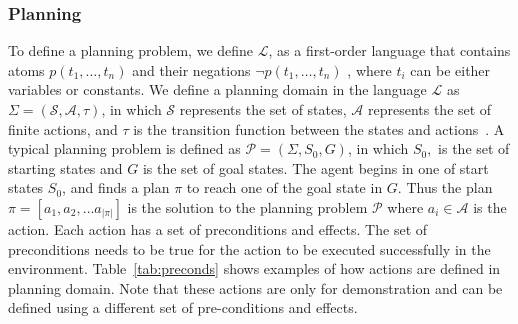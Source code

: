 \documentclass[sigconf]{aamas}
\begin{document}
\subsubsection{Planning}
To define a planning problem, we define $\mathcal{L}$, as a first-order language that contains atoms $p\left(t_{1}, \ldots, t_{n}\right)$ and their negations $\neg p\left(t_{1},\ldots, t_{n}\right)$ , where $t_{i}$ can be either variables or constants. We define a planning domain in the language $\mathcal{L}$ as $\Sigma=(\mathcal{S}, \mathcal{A}, \tau)$, in which $\mathcal{S}$ represents the set of states, $\mathcal{A}$ represents the set of finite actions, and $\tau$ is the transition function between the states and actions~\citep{sarathy2018macgyver}. A typical planning problem is defined as $\mathcal{P}=\left(\Sigma, S_{0}, G\right)$, in which $S_{0},$ is the set of starting states and $G$ is the set of goal states.
The agent begins in one of start states $S_{0}$, and finds a plan $\pi$ to reach one of the goal state in $G$. Thus the plan $\pi=\left[a_{1}, a_{2}, \ldots a_{|\pi|}\right]$ is the solution to the planning problem $\mathcal{P}$ where $a_{i} \in \mathcal{A}$ is the action.
Each action has a set of preconditions and effects. The set of preconditions needs to be true for the action to be executed successfully in the environment. Table~\ref{tab:preconds} shows examples of how actions are defined in planning domain. Note that these actions are only for demonstration and can be defined using a different set of pre-conditions and effects.


\end{document}

